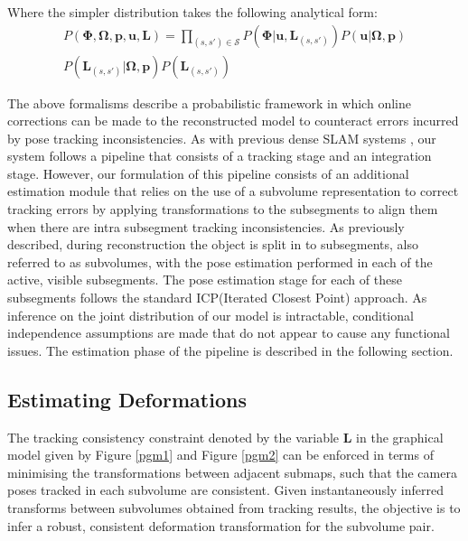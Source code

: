 Where the simpler distribution takes the following analytical form:
\begin{equation}
\begin{split}
P(\bm{\Phi}, \bm{\Omega}, \bm{p}, \bm{u}, \bm{L}) = 
\prod_{(s, s') \in \mathcal{S}} P(\bm{\Phi}|\bm{u}, \bm{L}_{(s, s')})
P(\bm{u}|\bm{\Omega}, \bm{p})\\
P(\bm{L}_{(s, s')}|\bm{\Omega}, \bm{p})
P(\bm{L}_{(s, s')})
\end{split}
\end{equation}

The above formalisms describe a probabilistic framework in which online corrections can be made to the reconstructed model to counteract 
errors incurred by pose tracking inconsistencies. As with previous dense SLAM systems \cite{Newcombe2011, Prisacariu2014, Niessner2013}, 
our system follows a pipeline that consists of a tracking stage and an integration stage. However, our formulation of this pipeline 
consists of an additional estimation module that relies on the use of a subvolume representation to correct tracking errors by applying 
transformations to the subsegments to align them when there are intra subsegment tracking inconsistencies. 
As previously described, during reconstruction the object is split in to subsegments, also referred to as subvolumes, 
with the pose estimation performed in each of the active, visible subsegments. The pose estimation stage for each of these subsegments follows 
the standard ICP(Iterated Closest Point) approach.
As inference on the joint distribution of our model is intractable, conditional independence assumptions are made that do not appear 
to cause any functional issues. The estimation phase of the pipeline is described in the following section.

\subsection{Estimating Deformations}
The tracking consistency constraint denoted by the variable $\bm{L}$ in the graphical model given by Figure \ref{pgm1} and Figure \ref{pgm2} can 
be enforced in terms of minimising the transformations between adjacent submaps, such that the camera poses tracked in each subvolume are consistent.  
Given instantaneously inferred transforms between subvolumes obtained from tracking results, 
the objective is to infer a robust, consistent deformation transformation for the subvolume pair.


